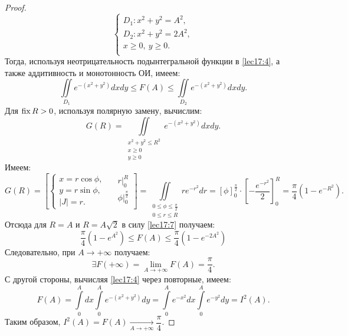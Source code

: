 \documentclass[../../main.tex]{subfiles}
\begin{document}
\begin{proof}
     \begin{equation}
		 	\label{lec17:6}
            \begin{cases}
                D_1 : x^2 + y^2 = A^2,\\
                D_2 : x^2 + y^2 = 2A^2,\\
                x \geq 0,\ y \geq 0.\\
            \end{cases}
		\end{equation}
  Тогда, используя неотрицательность подынтегральной 
  функции в \eqref{lec17:4}, а также аддитивность и монотонность ОИ, имеем:
	\begin{equation}
		\label{lec17:7}
		\iint\limits_{D_1}e^{-(x^2 + y^2)}dxdy \leq F(A) \leq
		\iint\limits_{D_2}e^{-(x^2 + y^2)}dxdy.
	\end{equation}
    Для $\operatorname{fix} R > 0$, используя полярную замену, вычислим:
	\begin{equation}
        \label{lec17:8}
		G(R) = \iint\limits_{\substack{
		x^2 + y^2 \leq R^2 \\
		x \geq 0 \\
		y \geq 0
		}}e^{-(x^2 + y^2)}dxdy.
	\end{equation}
	Имеем:
    \begin{equation*}
        G(R) =
        \left[
		\left\{
        \begin{gathered} 
        x = r \cos \phi,\\
        y = r \sin \phi,\\
        |J| = r.
        \end{gathered}
        \right. \quad
        \begin{gathered}
        r\vert_0^R\\
		\phi \vert_0^{\frac{\pi}{2}}\\
        \end{gathered}
        \right]
        = \iint\limits_{\substack{0\leq\phi\leq \frac{\pi}{2}\\
				0 \leq r \leq R}}r e^{-r^2}dr =
        \left[ \phi \right]_0^{\frac{\pi}{2}} \cdot
        \left[ -\frac{e^{-r^2}}{2} \right]_0^{R} =
        \frac{\pi}{4}(1 - e^{-R^2}).
	\end{equation*}
	Отсюда для $R = A$ и $R = A\sqrt{2}$ в силу \eqref{lec17:7} получаем:
	\begin{equation}
	 \frac{\pi}{4}(1 - e^{A^2}) \leq F(A) \leq
	 \frac{\pi}{4}(1 - e^{-2A^2})
	\end{equation}
    Следовательно, при $A \to +\infty$ получаем:
    \begin{equation}
    \exists F(+\infty)=\lim\limits_{A\to+\infty}F(A) = \frac{\pi}{4}.
    \end{equation}
    С другой стороны, вычисляя \eqref{lec17:4} через повторные, имеем:
    \begin{equation*}
     F(A)= \int\limits_0^{A}dx\int\limits_0^{A}e^{-(x^2+y^2)}dy = 
     \int\limits_0^{A}e^{-x^2}dx \int\limits_0^{A}e^{-y^2}dy = I^2(A).
    \end{equation*}
    Таким образом, $I^2(A) =
    F(A) \xrightarrow[A\to +\infty]{} \dfrac{\pi}{4}$.
    

\end{proof}
\end{document}
